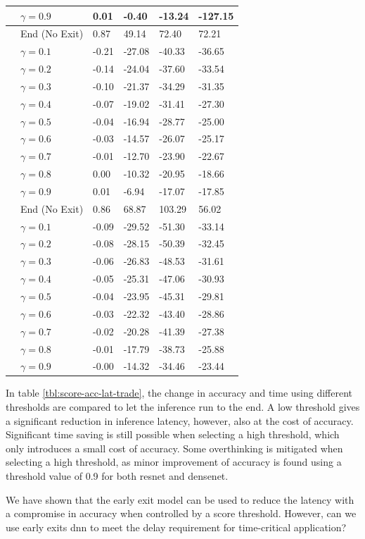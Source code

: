 \begin{scriptsize}
\begin{longtabu}{>{\bfseries}X|X|X[r]|X[r]|X[r]|X[r]}
			&$ \gamma = 0.9 $ 	&  0.01 &  -0.40 & -13.24 & -127.15 \tabularnewline 
			\hline
			 & End (No Exit) & 0.87 & 49.14 & 72.40 & 72.21 \tabularnewline {}
			&$ \gamma = 0.1 $ 	& -0.21 & -27.08 & -40.33 & -36.65  \tabularnewline
			&$ \gamma = 0.2 $ 	& -0.14 & -24.04 & -37.60 & -33.54  \tabularnewline 
			&$ \gamma = 0.3 $ 	& -0.10 & -21.37 & -34.29 & -31.35  \tabularnewline
			&$ \gamma = 0.4 $ 	& -0.07 & -19.02 & -31.41 & -27.30  \tabularnewline 
			&$ \gamma = 0.5 $ 	& -0.04 & -16.94 & -28.77 & -25.00  \tabularnewline
			&$ \gamma = 0.6 $ 	& -0.03 & -14.57 & -26.07 & -25.17  \tabularnewline 
			&$ \gamma = 0.7 $ 	& -0.01 & -12.70 & -23.90 & -22.67  \tabularnewline 
			&$ \gamma = 0.8 $ 	&  0.00 & -10.32 & -20.95 & -18.66  \tabularnewline 
			&$ \gamma = 0.9 $ 	&  0.01 &  -6.94 & -17.07 & -17.85  \tabularnewline 
			\hline
			 & End (No Exit) & 0.86 & 68.87 & 103.29 & 56.02 \tabularnewline {}
			&$ \gamma = 0.1 $ 	& -0.09 & -29.52 & -51.30 & -33.14 \tabularnewline
			&$ \gamma = 0.2 $ 	& -0.08 & -28.15 & -50.39 & -32.45 \tabularnewline 
			&$ \gamma = 0.3 $ 	& -0.06 & -26.83 & -48.53 & -31.61 \tabularnewline
			&$ \gamma = 0.4 $ 	& -0.05 & -25.31 & -47.06 & -30.93 \tabularnewline 
			&$ \gamma = 0.5 $ 	& -0.04 & -23.95 & -45.31 & -29.81 \tabularnewline
			&$ \gamma = 0.6 $ 	& -0.03 & -22.32 & -43.40 & -28.86 \tabularnewline 
			&$ \gamma = 0.7 $ 	& -0.02 & -20.28 & -41.39 & -27.38 \tabularnewline 
			&$ \gamma = 0.8 $ 	& -0.01 & -17.79 & -38.73 & -25.88 \tabularnewline 
			&$ \gamma = 0.9 $ 	& -0.00 & -14.32 & -34.46 & -23.44 \tabularnewline 
			\bottomrule
		\end{longtabu}
	
	\end{scriptsize}

In table \ref{tbl:score-acc-lat-trade}, the change in accuracy and time using different thresholds are compared to let the inference run to the end.
A low threshold gives a significant reduction in inference latency, however, also at the cost of accuracy. Significant time saving is still possible when selecting a high threshold, which only introduces a small cost of accuracy. Some overthinking is mitigated when selecting a high threshold, as minor improvement of accuracy is found using a threshold value of 0.9 for both \gls{resnet} and \gls{densenet}.

We have shown that the early exit model can be used to reduce the latency with a compromise in accuracy when controlled by a score threshold. However, can we use early exits \gls{dnn} to meet the delay requirement for time-critical application? 

